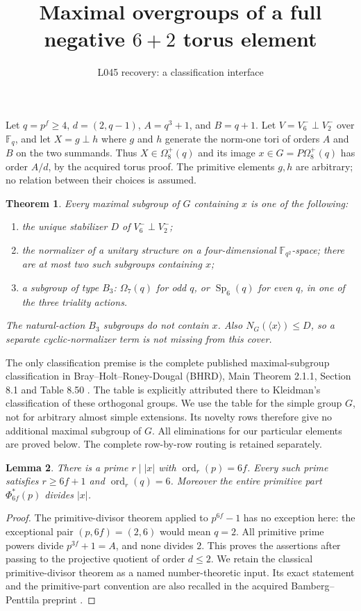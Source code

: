 \documentclass[11pt]{article}
\title{Maximal overgroups of a full negative $6+2$ torus element}
\author{L045 recovery: a classification interface}\date{}
\newtheorem{theorem}{Theorem}\newtheorem{lemma}[theorem]{Lemma}
\newcommand{\F}{\mathbb F}\newcommand{\Om}{\Omega}\newcommand{\PGU}{\operatorname{PGU}}\newcommand{\GL}{\operatorname{GL}}\newcommand{\End}{\operatorname{End}}\newcommand{\PSU}{\operatorname{PSU}}
\begin{document}
\maketitle
Let $q=p^f\ge4$, $d=(2,q-1)$, $A=q^3+1$, and $B=q+1$.
Let $V=V_6^-\perp V_2^-$ over $\F_q$, and let
$X=g\perp h$ where $g$ and $h$ generate the norm-one tori of orders
$A$ and $B$ on the two summands. Thus $X\in\Om_8^+(q)$ and its image
$x\in G=P\Om_8^+(q)$ has order $A/d$, by the acquired torus proof.
The primitive elements $g,h$ are arbitrary; no relation between their
choices is assumed.

\begin{theorem}\label{thm:cover}
Every maximal subgroup of $G$ containing $x$ is one of the following:
\begin{enumerate}
\item the unique stabilizer $D$ of $V_6^-\perp V_2^-$;
\item the normalizer of a unitary structure on a four-dimensional
$\F_{q^2}$-space; there are at most two such subgroups containing $x$;
\item a subgroup of type $B_3$: $\Om_7(q)$ for odd $q$, or
$\operatorname{Sp}_6(q)$ for even $q$, in one of the three triality actions.
\end{enumerate}
The natural-action $B_3$ subgroups do not contain $x$.
Also $N_G(\langle x\rangle)\le D$, so a separate cyclic-normalizer
term is not missing from this cover.
\end{theorem}

The only classification premise is the complete published maximal-subgroup
classification in Bray--Holt--Roney-Dougal (BHRD), Main Theorem 2.1.1,
Section 8.1 and Table 8.50 \cite{BHRD}. The table is explicitly attributed
there to Kleidman's classification of these orthogonal groups.
We use the table for the simple group $G$, not for arbitrary almost simple
extensions. Its novelty rows therefore give no additional maximal subgroup
of $G$. All eliminations for our particular elements are proved below.
The complete row-by-row routing is retained separately.

\begin{lemma}\label{lem:primitive}
There is a prime $r\mid |x|$ with $\operatorname{ord}_r(p)=6f$.
Every such prime satisfies $r\ge6f+1$ and $\operatorname{ord}_r(q)=6$.
Moreover the entire primitive part $\Phi_{6f}^*(p)$ divides $|x|$.
\end{lemma}
\begin{proof}
The primitive-divisor theorem applied to $p^{6f}-1$ has no exception here:
the exceptional pair $(p,6f)=(2,6)$ would mean $q=2$.
All primitive prime powers divide $p^{3f}+1=A$, and none divides $2$.
This proves the assertions after passing to the projective quotient of order
$d\le2$. We retain the classical primitive-divisor theorem as a named
number-theoretic input. Its exact statement and the primitive-part convention
are also recalled in the acquired Bamberg--Penttila preprint
\cite[pp.2--3]{BP}.
\end{proof}
\end{document}
